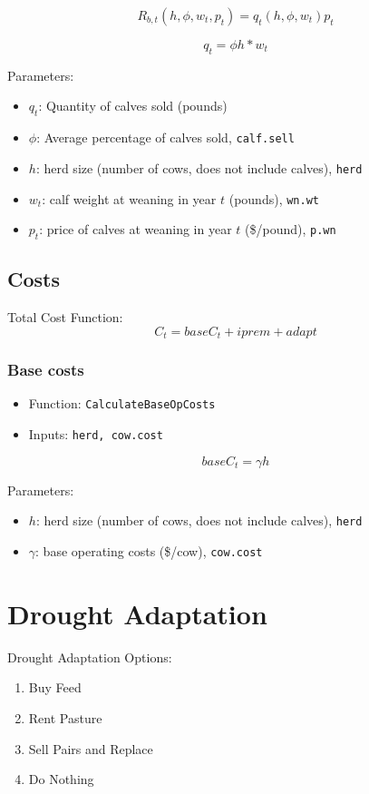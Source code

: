 \documentclass[11pt]{article}
\begin{document}
\begin{equation} \label{baserevenues}
R_{b,t}(h,\phi, w_t, p_t) = q_t (h,\phi, w_t) p_t
\end{equation}

\begin{equation}
q_t = \phi h * w_t
\end{equation}

Parameters:
\begin{itemize}
\item $q_t$: Quantity of calves sold (pounds)
\item \(\phi\): Average percentage of calves sold, \verb!calf.sell!
\item \(h\): herd size (number of cows, does not include calves), \verb!herd! 
\item $w_t$: calf weight at weaning in year \(t\) (pounds),  \verb!wn.wt!
\item $p_t$: price of calves at weaning in year \(t\) (\$/pound), \verb!p.wn!
\end{itemize}

\subsection{Costs}
Total Cost Function:
\begin{equation}
C_t = baseC_t + iprem + adapt
\end{equation}


\subsubsection{Base costs}
\begin{itemize}
\item Function: \verb!CalculateBaseOpCosts!
\item Inputs: \verb!herd, cow.cost!
\end{itemize}

\begin{equation}
baseC_t = \gamma h 
\end{equation}

Parameters:
\begin{itemize}
\item \(h\): herd size (number of cows, does not include calves), \verb!herd!
\item \(\gamma\): base operating costs (\$/cow), \verb!cow.cost!
\end{itemize}

\section{Drought Adaptation}
Drought Adaptation Options:
\begin{enumerate}
\item Buy Feed
\item Rent Pasture
\item Sell Pairs and Replace
\item Do Nothing
\end{enumerate}
\end{document}
